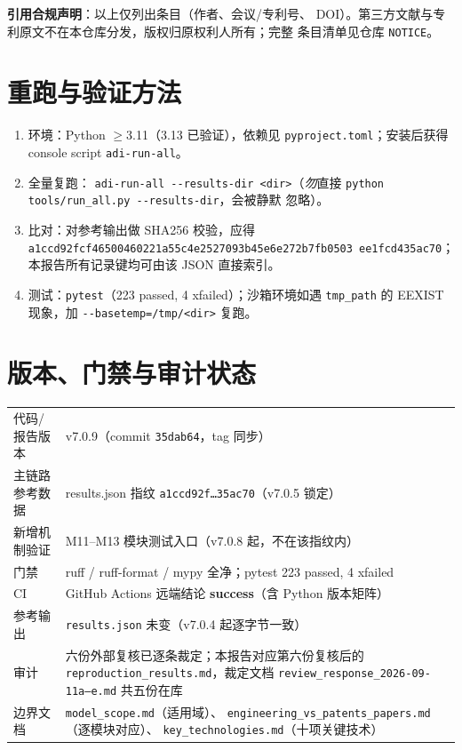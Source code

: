 \documentclass[11pt,a4paper,fontset=fandol]{ctexart}
\begin{document}
\noindent\textbf{引用合规声明}：以上仅列出条目（作者、会议/专利号、
DOI）。第三方文献与专利原文不在本仓库分发，版权归原权利人所有；完整
条目清单见仓库 \texttt{NOTICE}。

\FloatBarrier
\appendix
\section{重跑与验证方法}

\begin{enumerate}[itemsep=1pt]
  \item 环境：Python $\geq$3.11（3.13 已验证），依赖见
        \texttt{pyproject.toml}；安装后获得 console script
        \texttt{adi-run-all}。
  \item 全量复跑：
        \texttt{adi-run-all -{}-results-dir <dir>}（\emph{勿}直接
        \texttt{python tools/run\_all.py -{}-results-dir}，会被静默
        忽略）。
  \item 比对：对参考输出做 SHA256 校验，应得
        \texttt{a1ccd92fcf46500460221a55c4e2527093b45e6e272b7fb0503
        ee1fcd435ac70}；本报告所有记录键均可由该 JSON 直接索引。
  \item 测试：\texttt{pytest}（223 passed, 4 xfailed）；沙箱环境如遇
        \texttt{tmp\_path} 的 EEXIST 现象，加
        \texttt{-{}-basetemp=/tmp/<dir>} 复跑。
\end{enumerate}

\section{版本、门禁与审计状态}

\begin{table}[h]\centering\small
\begin{tabular}{@{}p{4.2cm}p{9.6cm}@{}}
\toprule
代码/报告版本 & v7.0.9（commit \texttt{35dab64}，tag 同步）\\
主链路参考数据 & results.json 指纹 \texttt{a1ccd92f…35ac70}（v7.0.5 锁定）\\
新增机制验证 & M11--M13 模块测试入口（v7.0.8 起，不在该指纹内）\\
门禁 & ruff / ruff-format / mypy 全净；pytest 223 passed, 4 xfailed\\
CI & GitHub Actions 远端结论 \textbf{success}（含 Python 版本矩阵）\\
参考输出 & \texttt{results.json} 未变（v7.0.4 起逐字节一致）\\
审计 & 六份外部复核已逐条裁定；本报告对应第六份复核后的
        \texttt{reproduction\_results.md}，裁定文档
        \texttt{review\_response\_2026-09-11a--e.md} 共五份在库\\
边界文档 & \texttt{model\_scope.md}（适用域）、
        \texttt{engineering\_vs\_patents\_papers.md}（逐模块对应）、
        \texttt{key\_technologies.md}（十项关键技术）\\
\bottomrule
\end{tabular}
\end{table}
\end{document}
